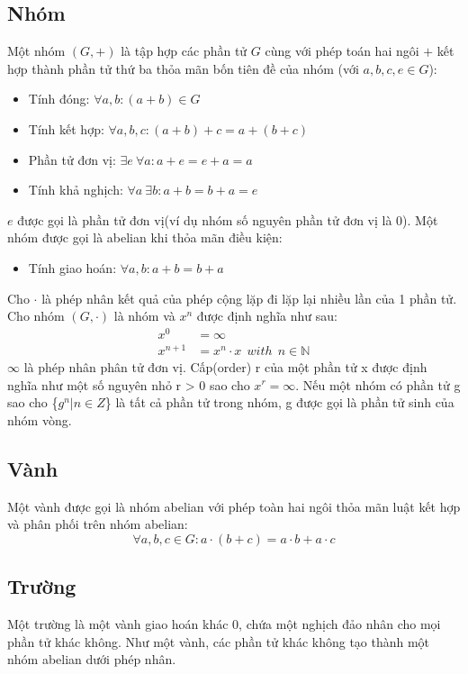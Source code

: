 \documentclass[a4paper,12pt]{report}
\begin{document}
\subsection*{Nhóm}
Một nhóm $(G, +)$ là tập hợp các phần tử $G$ cùng với phép toán hai ngôi $+$ kết hợp thành phần tử thứ ba thỏa mãn bốn tiên đề của nhóm (với $ a, b , c, e \in G$):
\begin{itemize}
\item Tính đóng: $\forall a, b: (a + b) \in G$
\item Tính kết hợp: $\forall a, b, c: (a + b) + c = a + (b + c)$
\item Phần tử đơn vị: $\exists e \ \forall a: a + e = e + a = a$
\item Tính khả nghịch: $\forall a \ \exists b: a + b = b + a = e$
\end{itemize}
$e$ được gọi là phần tử đơn vị(ví dụ nhóm số nguyên phần tử đơn vị là 0). Một nhóm được gọi là abelian khi thỏa mãn điều kiện:
\begin{itemize}
\item Tính giao hoán: $\forall a,b: a + b = b + a$
\end{itemize}
Cho $\cdot$ là phép nhân kết quả của phép cộng lặp đi lặp lại nhiều lần của 1 phần tử. Cho nhóm $(G, \cdot)$ là nhóm và $x^n$ được định nghĩa như sau:
\begin{displaymath}
\begin{aligned}
x^0 & = \infty \\
x^{n + 1} & = x^n\cdot x \ \ with \ \ n \in \mathbb{N}
\end{aligned}
\end{displaymath}
$\infty$ là phép nhân phân tử đơn vị. Cấp(order) r của một phần tử x được định nghĩa như một số nguyên nhỏ r > 0 sao cho $x^r = \infty$. Nếu một nhóm có phần tử g sao cho \{$g^n | n \in Z$\} là tất cả phần tử trong nhóm, g được gọi là phần tử sinh của nhóm vòng.
\subsection*{Vành}
Một vành được gọi là nhóm abelian với phép toàn hai ngôi thỏa mãn luật kết hợp và phân phối trên nhóm abelian:
\begin{displaymath}
\forall a, b, c \in G: a\cdot (b + c) = a \cdot b + a \cdot c
\end{displaymath}
\subsection*{Trường}
Một trường là một vành giao hoán khác 0, chứa một nghịch đảo nhân cho mọi phần tử khác không. Như một vành, các phần tử khác không tạo thành một nhóm abelian dưới phép nhân.
\end{document}
